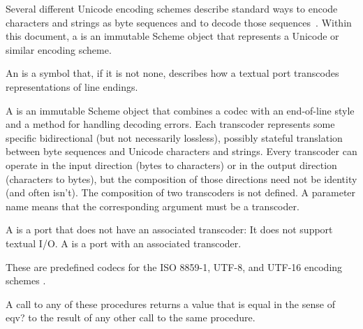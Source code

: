 Several different Unicode encoding schemes describe standard ways to
encode characters and strings as byte sequences and to decode those
sequences~\cite{Unicode}.
Within this document, a  is an immutable Scheme
object that represents a Unicode or similar encoding scheme.

An  is a symbol that, if it is not {\cf
  none}, describes how a textual port transcodes representations of
line endings.

A  is an immutable Scheme object that combines
a codec with an end-of-line style and a method for handling
decoding errors.
Each transcoder represents some specific bidirectional (but not
necessarily lossless), possibly stateful translation between byte
sequences and Unicode characters and strings.
Every transcoder can operate in the input direction (bytes to characters)
or in the output direction (characters to bytes),
but the composition of those directions need not be identity (and
often isn't).  The composition of two transcoders is not defined.
A  parameter name means that the corresponding
argument must be a transcoder.

A  is a port that does not have an associated
transcoder: It does not support textual I/O.  A  is a port with an associated transcoder.

\begin{entry}{%
}

These are predefined codecs for the ISO 8859-1, UTF-8,
and UTF-16 encoding schemes \cite{Unicode}.

A call to any of these procedures returns a value that is equal in the
sense of {\cf eqv?} to the result of any other call to the same
procedure.
\end{entry}

